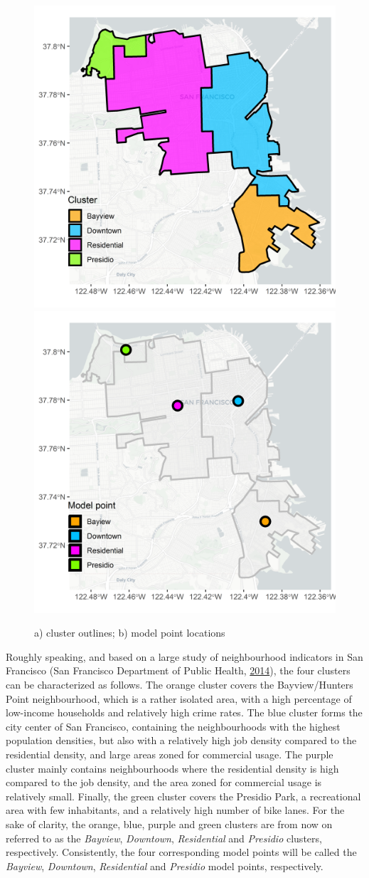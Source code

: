 \documentclass[12pt,oneside]{reedthesis}
\begin{document}
\begin{figure}[H]
\includegraphics[width=0.5\linewidth]{Figures/clusters} \includegraphics[width=0.5\linewidth]{Figures/modelpoints} \caption{a) cluster outlines; b) model point locations}\label{fig:clusters}
\end{figure}
Roughly speaking, and based on a large study of neighbourhood indicators
in San Francisco (San Francisco Department of Public Health,
\protect\hyperlink{ref-sfindicator}{2014}), the four clusters can be
characterized as follows. The orange cluster covers the Bayview/Hunters
Point neighbourhood, which is a rather isolated area, with a high
percentage of low-income households and relatively high crime rates. The
blue cluster forms the city center of San Francisco, containing the
neighbourhoods with the highest population densities, but also with a
relatively high job density compared to the residential density, and
large areas zoned for commercial usage. The purple cluster mainly
contains neighbourhoods where the residential density is high compared
to the job density, and the area zoned for commercial usage is
relatively small. Finally, the green cluster covers the Presidio Park, a
recreational area with few inhabitants, and a relatively high number of
bike lanes. For the sake of clarity, the orange, blue, purple and green
clusters are from now on referred to as the \emph{Bayview},
\emph{Downtown}, \emph{Residential} and \emph{Presidio} clusters,
respectively. Consistently, the four corresponding model points will be
called the \emph{Bayview}, \emph{Downtown}, \emph{Residential} and
\emph{Presidio} model points, respectively.
\end{document}
